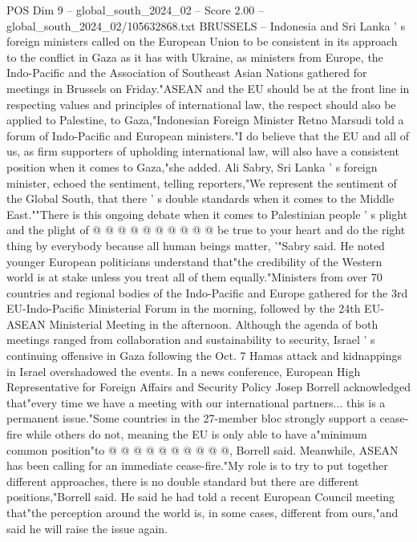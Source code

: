 \begin{textsample}{POS Dim 9 – global\_south\_2024\_02 – Score 2.00 – global\_south\_2024\_02/105632868.txt}  \label{ex:f9_pos_096}
BRUSSELS -- Indonesia and Sri Lanka ' s foreign ministers called on the European Union to be consistent in its approach to the conflict in Gaza as it has with Ukraine, as ministers from Europe, the Indo-Pacific and the Association of Southeast Asian Nations gathered for meetings in Brussels on Friday."ASEAN and the EU should be at the front line in respecting values and principles of international law, the respect should also be applied to Palestine, to Gaza,"Indonesian Foreign Minister Retno Marsudi told a forum of Indo-Pacific and European ministers."I do believe that the EU and all of us, as firm supporters of upholding international law, will also have a consistent position when it comes to Gaza,"she added.
Ali Sabry, Sri Lanka ' s foreign minister, echoed the sentiment, telling reporters,"We represent the sentiment of the Global South, that there ' s double standards when it comes to the Middle East.""There is this ongoing debate when it comes to Palestinian people ' s plight and the plight of @ @ @ @ @ @ @ @ @ @ be true to your heart and do the right thing by everybody because all human beings matter, '"Sabry said.
He noted younger European politicians understand that"the credibility of the Western world is at stake unless you treat all of them equally."Ministers from over 70 countries and regional bodies of the Indo-Pacific and Europe gathered for the 3rd EU-Indo-Pacific Ministerial Forum in the morning, followed by the 24th EU-ASEAN Ministerial Meeting in the afternoon.
Although the agenda of both meetings ranged from collaboration and sustainability to security, Israel ' s continuing offensive in Gaza following the Oct. 7 Hamas attack and kidnappings in Israel overshadowed the events.
In a news conference, European High Representative for Foreign Affairs and Security Policy Josep Borrell acknowledged that"every time we have a meeting with our international partners... this is a permanent issue."Some countries in the 27-member bloc strongly support a cease-fire while others do not, meaning the EU is only able to have a"minimum common position"to @ @ @ @ @ @ @ @ @ @, Borrell said.
Meanwhile, ASEAN has been calling for an immediate cease-fire."My role is to try to put together different approaches, there is no double standard but there are different positions,"Borrell said.
He said he had told a recent European Council meeting that"the perception around the world is, in some cases, different from ours,"and said he will raise the issue again.

\end{textsample}
